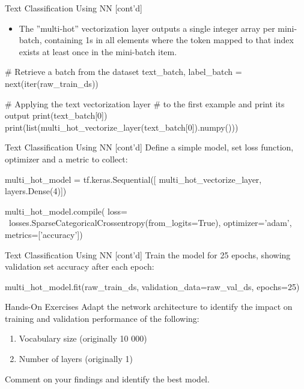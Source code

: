 \documentclass[ignorenonframetext,xcolor=x11names]{beamer}
\begin{document}
\begin{frame}[fragile]{Text Classification Using NN \small [cont'd]}
\begin{itemize}
   \item The ''multi-hot'' vectorization layer outputs a single integer array per mini-batch, containing 1s in all elements where the token mapped to that index exists at least once in the mini-batch item. 
\end{itemize}

\begin{pythoncode}
# Retrieve a batch from the dataset
text_batch, label_batch = next(iter(raw_train_ds))

# Applying the text vectorization layer 
# to the first example and print its output
print(text_batch[0])
print(list(multi_hot_vectorize_layer(text_batch[0]).numpy()))
\end{pythoncode}
\end{frame}

\begin{frame}[fragile]{Text Classification Using NN \small [cont'd]}
Define a simple model, set loss function, optimizer and a metric to collect:
\begin{pythoncode}
multi_hot_model = tf.keras.Sequential([
    multi_hot_vectorize_layer,
    layers.Dense(4)])

multi_hot_model.compile(
    loss= \
      losses.SparseCategoricalCrossentropy(from_logits=True),
    optimizer='adam',
    metrics=['accuracy'])
\end{pythoncode}
\end{frame}

\begin{frame}[fragile]{Text Classification Using NN \small [cont'd]}
Train the model for 25 epochs, showing validation set accuracy after each epoch:
\begin{pythoncode}
multi_hot_model.fit(raw_train_ds, 
                    validation_data=raw_val_ds, 
                    epochs=25)
\end{pythoncode}
\end{frame}

\begin{frame}{Hands-On Exercises}
Adapt the network architecture to identify the impact on training and validation performance of the following:
   \begin{enumerate}
      \item Vocabulary size (originally 10 000)
      \item Number of layers (originally 1)
   \end{enumerate}
Comment on your findings and identify the best model.
\end{frame}
\end{document}
